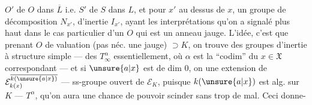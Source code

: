$O'$ de $O$ dans $\overline L$ i.e. $S'$ de $S$ dans $L$, et pour $x'$ au dessus de $x$, un groupe de décomposition $N_{x'}$, d'inertie $I_{x'}$, ayant les interprétations qu'on a signalé plus haut dans le cas particulier d'un $O$ qui est un anneau jauge. L'idée, c'est que prenant $O$ de valuation (pas néc. une jauge) $\supset K$, on trouve des groupes d'inertie à structure simple --- des $T_\infty^\alpha$ essentiellement, où $\alpha$ est la ``codim'' du $x\in\mathfrak X$ correspondant --- et si $\unsure{a|x}$ est de dim 0, on  une extension de $\mathcal E_{k(x)}^{\overline{k(\unsure{a|x})}}$ --- ss-groupe ouvert de $\mathcal E_K$, puisque $k(\unsure{a|x})$ est  alg. sur $K$ ---  $T^\alpha$, qu'on aura une chance de pouvoir scinder sans trop de mal. Ceci donne-
